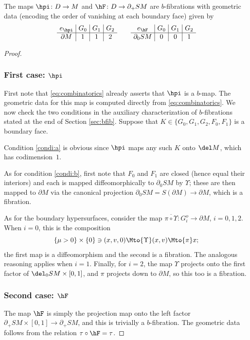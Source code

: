 \begin{Lemma}\label{lem:bfibrations}
The maps $\hpi\colon D\to M$ and $\hF\colon D\to \partial_+ SM$ are $b$-fibrations with geometric data (encoding
the order of vanishing at each boundary face) given by\vspace*{-3pt}
\begin{equation*}\arraycolsep4pt
\begin{array}{c|c|c|c}
e_{\hpi} & G_0 & G_1 & G_2 \\
\hline
\partial M & 1 & 1 & 2
\end{array}
\qquad
\begin{array}{c|c|c|c}
e_{\hF} & G_0 & G_1 & G_2 \\
\hline
\partial_0 SM & 0 & 0 & 1
\end{array}
\end{equation*}
\end{Lemma}

\skpt
\begin{proof}\vspace*{-3pt}
\subsubsection*{First case: $\hpi$}
First note that \eqref{eq:combinatorics} already asserts that $\hpi$ is a $b$-map.
The geometric data for this map is computed directly from \eqref{eq:combinatorics}. We now check the two
conditions in the auxiliary characterization of $b$-fibrations stated at the end of Section \ref{sec:bfib}. Suppose that $K \in \{G_0, G_1, G_2, F_0, F_1\}$ is a boundary face.

Condition \eqref{condi:a} is obvious since $\hpi$ maps any such $K$ onto $\del M$, which has codimension~$1$.

As for condition \eqref{condi:b}, first note that $F_0$ and $F_1$ are closed (hence equal their interiors) and each is mapped
diffeomorphically to $\partial_0 SM$ by $\Upsilon$; these are then mapped to $\partial M$ via the canonical projection
$\partial_{0} SM = S (\partial M) \to \partial M$, which is a fibration.

As for the boundary hypersurfaces, consider the map $\overline{\pi\circ\Upsilon} \colon G_i^o \to \partial M$, $i=0,1,2$.
When $i = 0$, this is the composition
\begin{equation*}
\{ \mu>0\}\times \{0\}\ni (x,v,0) \Mto{\Upsilon} (x,v) \Mto{\pi} x;
\end{equation*}
the first map is a diffeomorphism and the second is a fibration. The analogous reasoning applies when $i = 1$. Finally, for $i=2$,
the map $\Upsilon$ projects onto the first factor of $\del_0 SM \times [0,1]$, and $\pi$ projects down to $\partial M$, so this
too is a fibration.

\subsubsection*{Second case: $\hF$}
The map $\hF$ is simply the projection map onto the left factor $\partial_+{SM}\times [0,1]\to \partial_+ SM$, and this
is trivially a $b$-fibration. The geometric data follows from the relation $\tau\circ\hF = \tau$.
\end{proof}


